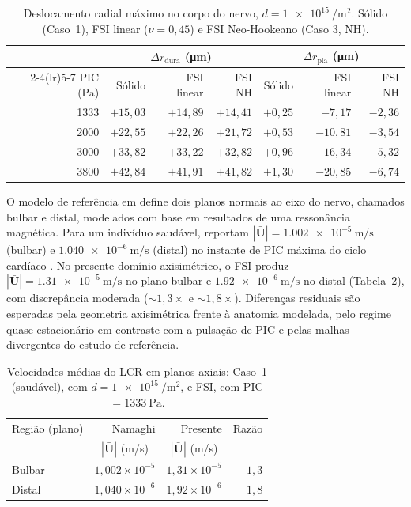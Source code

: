 \documentclass[article, hidelinks,oneside,12pt]{abntex2}
\begin{document}
\begin{table}[h!]
\centering
\small
\caption{Deslocamento radial máximo no corpo do nervo, $d = \SI{1e15}{\per\meter\squared}$. Sólido (Caso~1), FSI linear ($\nu = 0{,}45$) e FSI Neo-Hookeano (Caso 3, NH).}

\label{tab:met-val-estrutural}
\begin{tabular}{r r r r r r r}
\toprule
 &
\multicolumn{3}{c}{$\Delta r_{\mathrm{dura}}$ (\si{\micro\meter})} &
\multicolumn{3}{c}{$\Delta r_{\mathrm{pia}}$ (\si{\micro\meter})} \\
\cmidrule(lr){2-4}\cmidrule(lr){5-7}
PIC (\si{\pascal}) & Sólido & FSI linear & FSI NH & Sólido & FSI linear & FSI NH \\
\midrule
1333 & $+15{,}03$ & $+14{,}89$ & $+14{,}41$ & $+0{,}25$ & $-7{,}17$ & $-2{,}36$ \\
2000 & $+22{,}55$ & $+22{,}26$ & $+21{,}72$ & $+0{,}53$ & $-10{,}81$ & $-3{,}54$ \\
3000 & $+33{,}82$ & $+33{,}22$ & $+32{,}82$ & $+0{,}96$ & $-16{,}34$ & $-5{,}32$ \\
3800 & $+42{,}84$ & $+41{,}91$ & $+41{,}82$ & $+1{,}30$ & $-20{,}85$ & $-6{,}74$ \\
\bottomrule
\end{tabular}
\end{table}

O modelo de referência em  define dois planos normais ao eixo do nervo, chamados bulbar e distal, modelados com base em resultados de uma ressonância magnética. Para um indivíduo saudável, reportam $|\bar{\mathbf{U}}| = \SI{1.002e-5}{\meter\per\second}$ (bulbar) e $\SI{1.040e-6}{\meter\per\second}$ (distal) no instante de PIC máxima do ciclo cardíaco \cite{namaghi2026}. No presente domínio axisimétrico, o FSI produz $|\bar{\mathbf{U}}| = \SI{1.31e-5}{\meter\per\second}$ no plano bulbar e $\SI{1.92e-6}{\meter\per\second}$ no distal (Tabela~\ref{tab:met-val-vel}), com discrepância moderada ($\sim 1{,}3\times$ e $\sim 1{,}8\times$). Diferenças residuais são esperadas pela geometria axisimétrica frente à anatomia modelada, pelo regime quase-estacionário em contraste com a pulsação de PIC e pelas malhas divergentes do estudo de referência.

\begin{table}[h!]
\centering
\small
\caption{Velocidades médias do LCR em planos axiais:  Caso~1 (saudável), com $d = \SI{1e15}{\per\meter\squared}$, e FSI, com PIC $= \SI{1333}{\pascal}$.}
\label{tab:met-val-vel}
\begin{tabular}{l r r r}
\toprule
Região (plano) & Namaghi & Presente & Razão \\
 & \multicolumn{1}{c}{$|\bar{\mathbf{U}}|$ (m/s)} & \multicolumn{1}{c}{$|\bar{\mathbf{U}}|$ (m/s)} & \\
\midrule
Bulbar & $1{,}002 \times 10^{-5}$ & $1{,}31 \times 10^{-5}$ & $1{,}3$ \\
Distal & $1{,}040 \times 10^{-6}$ & $1{,}92 \times 10^{-6}$ & $1{,}8$ \\
\bottomrule
\end{tabular}
\end{table}
\end{document}
